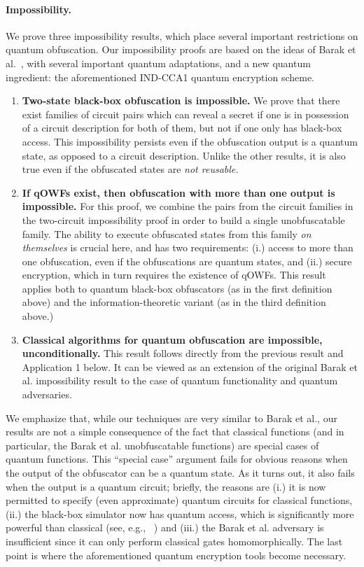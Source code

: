 \documentclass[envcountsame]{llncs}
\numberwithin{equation}{section}
\begin{document}
\paragraph{Impossibility.} We prove three impossibility results, which place several important restrictions on quantum obfuscation. Our impossibility proofs are based on the ideas of Barak et al.~\cite{BGIRSVY12}, with several important quantum adaptations, and a new quantum ingredient: the aforementioned IND-CCA1 quantum encryption scheme.
\begin{enumerate}
\item \textbf{Two-state black-box obfuscation is impossible.} We prove that there exist families of circuit pairs which can reveal a secret if one is in possession of a circuit description for both of them, but not if one only has black-box access. This impossibility persists even if the obfuscation output is a quantum state, as opposed to a circuit description. Unlike the other results, it is also true even if the obfuscated states are \emph{not reusable.}
\item \textbf{If qOWFs exist, then obfuscation with more than one output is impossible.} For this proof, we combine the pairs from the circuit families in the two-circuit impossibility proof in order to build a single unobfuscatable family. The ability to execute obfuscated states from this family \emph{on themselves} is crucial here, and has two requirements: (i.) access to more than one obfuscation, even if the obfuscations are quantum states, and (ii.) secure encryption, which in turn requires the existence of qOWFs. This result applies both to quantum black-box obfuscators (as in the first definition above) and the information-theoretic variant (as in the third definition above.) 
\item \textbf{Classical algorithms for quantum obfuscation are impossible, unconditionally.} This result follows directly from the previous result and Application 1 below. It can be viewed as an extension of the original Barak et al. impossibility result to the case of quantum functionality and quantum adversaries.
\end{enumerate}
We emphasize that, while our techniques are very similar to Barak et al., our results are not a simple consequence of the fact that classical functions (and in particular, the Barak et al. unobfuscatable functions) are special cases of quantum functions. This ``special case'' argument fails for obvious reasons when the output of the obfuscator can be a quantum state. As it turns out, it also fails when the output is a quantum circuit; briefly, the reasons are (i.) it is now permitted to specify (even approximate) quantum circuits for classical functions, (ii.) the black-box simulator now has quantum access, which is significantly more powerful than classical (see, e.g., ~\cite{HR14}) and (iii.) the Barak et al. adversary is insufficient since it can only perform classical gates homomorphically. The last point is where the aforementioned quantum encryption tools become necessary.
\end{document}
